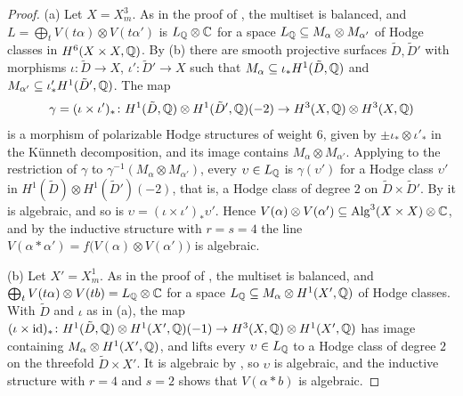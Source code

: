 \begin{proof}
(a) Let $X=X^{3}_{m}$. As in the proof of , the multiset is
balanced, and $L=\bigoplus_{t}V(t\alpha)\otimes V(t\alpha')$ is $L_{\mathbb{Q}}
\otimes\mathbb{C}$ for a space $L_{\mathbb{Q}}\subseteq M_{\alpha}\otimes M_{\alpha'}$ of
Hodge classes in $H^{6}(X\times X,\mathbb{Q})$. By (b) there are
smooth projective surfaces $\tilde D,\tilde D'$ with morphisms $\iota\colon
\tilde D\to X$, $\iota'\colon\tilde D'\to X$ such that $M_{\alpha}\subseteq
\iota_{*}H^{1}(\tilde D,\mathbb{Q})$ and $M_{\alpha'}\subseteq\iota'_{*}H^{1}
(\tilde D',\mathbb{Q})$. The map
\[
  \gamma=(\iota\times\iota')_{*}\colon H^{1}(\tilde D,\mathbb{Q})\otimes
  H^{1}(\tilde D',\mathbb{Q})(-2)\to H^{3}(X,\mathbb{Q})\otimes H^{3}(X,\mathbb{Q})
\]
is a morphism of polarizable Hodge structures of weight $6$, given by
$\pm\iota_{*}\otimes\iota'_{*}$ in the K\"unneth decomposition, and its image
contains $M_{\alpha}\otimes M_{\alpha'}$. Applying  to the
restriction of $\gamma$ to $\gamma^{-1}(M_{\alpha}\otimes M_{\alpha'})$,
every $\upsilon\in L_{\mathbb{Q}}$ is $\gamma(\upsilon')$ for a Hodge class
$\upsilon'$ in $H^{1}(\tilde D)\otimes H^{1}(\tilde D')(-2)$, that is, a
Hodge class of degree $2$ on $\tilde D\times\tilde D'$. By 
it is algebraic, and so is $\upsilon=(\iota\times\iota')_{*}\upsilon'$.
Hence $V(\alpha)\otimes V(\alpha')\subseteq\operatorname{Alg}^{3}(X\times X)\otimes\mathbb{C}$,
and by the inductive structure with $r=s=4$ the line $V(\alpha*\alpha')=
f\bigl(V(\alpha)\otimes V(\alpha')\bigr)$ is algebraic.

(b) Let $X'=X^{1}_{m}$. As in the proof of , the
multiset is balanced, and $\bigoplus_{t}V(t\alpha)\otimes V(tb)=L_{\mathbb{Q}}
\otimes\mathbb{C}$ for a space $L_{\mathbb{Q}}\subseteq M_{\alpha}\otimes H^{1}(X',\mathbb{Q})$
of Hodge classes. With $\tilde D$ and $\iota$ as in (a), the map
$(\iota\times\mathrm{id})_{*}\colon H^{1}(\tilde D,\mathbb{Q})\otimes H^{1}(X',\mathbb{Q})
(-1)\to H^{3}(X,\mathbb{Q})\otimes H^{1}(X',\mathbb{Q})$ has image containing
$M_{\alpha}\otimes H^{1}(X',\mathbb{Q})$, and  lifts every
$\upsilon\in L_{\mathbb{Q}}$ to a Hodge class of degree $2$ on the threefold
$\tilde D\times X'$. It is algebraic by , so $\upsilon$ is
algebraic, and the inductive structure with $r=4$ and $s=2$ shows that
$V(\alpha*b)$ is algebraic.
\end{proof}

